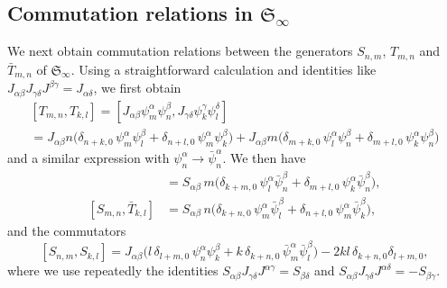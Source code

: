\documentclass[11pt]{article}
\newcommand{\strt}{T}
\newcommand{\bstrt}{\bar{\strt}}
\newcommand{\sferm}{\psi}
\newcommand{\bsferm}{\bar{\psi}}
\newcommand{\interLie}{\mathfrak{S}}
\newcommand{\interinfin}{\interLie_{\infty}}
\newcommand{\enrg}{S}
\theoremstyle{definition}
\begin{document}
\subsection{Commutation relations in $\interinfin$}\label{commrels}
 We next obtain commutation relations
between the generators  $\enrg_{n,m}$,
 $\strt_{m,n}$ and $\bstrt_{m,n}$ of $\interinfin$.
Using a straightforward calculation and identities like $J_{\alpha\beta}J_{\gamma\delta}J^{\beta\gamma}  = J_{\alpha\delta}$, we first obtain
\begin{multline}\label{interch-comm-rel-TT}
[\strt_{m,n},\strt_{k,l}]=[J_{\alpha\beta}\sferm^{\alpha}_{m}\sferm^{\beta}_{n}, J_{\gamma\delta}\sferm^{\gamma}_{k}\sferm^{\delta}_{l}] \\
= J_{\alpha\beta} n \bigl(\delta_{n+k,0}\, \psi^{\alpha}_m \psi^{\beta}_l +
\delta_{n+l,0} \,\psi^{\alpha}_m \psi^{\beta}_k  \bigr)
+ J_{\alpha\beta} m \bigl(\delta_{m+k,0}\, \psi^{\alpha}_l \psi^{\beta}_n +
\delta_{m+l,0} \,\psi^{\alpha}_k \psi^{\beta}_n  \bigr)
\end{multline}
and a similar expression with $\sferm^{\alpha}_n\to\bsferm^{\alpha}_n$.
We then have
\begin{align}
[\enrg_{m,n} , \strt_{k,l} ] &= S_{\alpha\beta}\, m \bigl(\delta_{k+m,0}\, \sferm^{\alpha}_l \bsferm^{\beta}_n +
\delta_{m+l,0} \,\sferm^{\alpha}_k \bsferm^{\beta}_n  \bigr),\label{interch-comm-rel-1}\\
[\enrg_{m,n} , \bstrt_{k,l} ] &= S_{\alpha\beta}\, n \bigl(\delta_{k+n,0}\, \sferm^{\alpha}_m \bsferm^{\beta}_l +
\delta_{n+l,0} \,\sferm^{\alpha}_m \bsferm^{\beta}_k  \bigr),\label{interch-comm-rel-2}
\end{align}
and the commutators
\begin{equation}\label{interch-comm-rel}
[\enrg_{n,m} , \enrg_{k,l} ] = J_{\alpha\beta}\bigl(l\,\delta_{l+m,0}\, \psi^{\alpha}_n \psi^{\beta}_k +
k\,\delta_{k+n,0} \,\bar{\psi}^{\alpha}_m \bar{\psi}^{\beta}_l  \bigr) - 2kl\,\delta_{k+n,0}\delta_{l+m,0},
\end{equation}
where we use repeatedly the identities $S_{\alpha\beta}J_{\gamma\delta}J^{\alpha\gamma}  = S_{\beta\delta}$ and
$S_{\alpha\beta}J_{\gamma\delta}J^{\alpha\delta}  = -S_{\beta\gamma}$.
\end{document}
